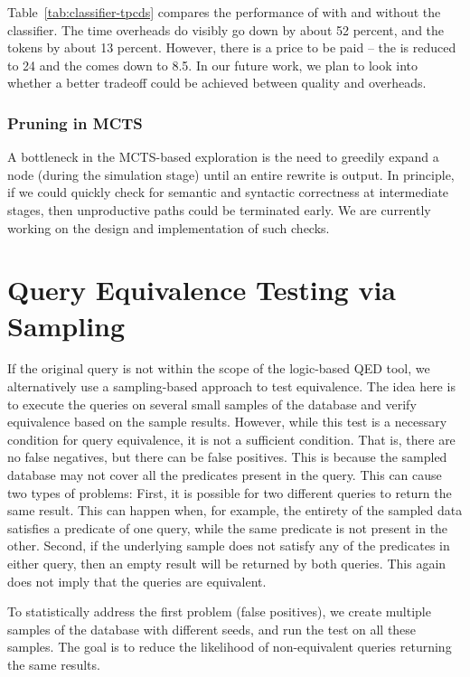 Table~\ref{tab:classifier-tpcds} compares the performance of \lithe with and without the classifier. The time overheads do visibly go down by about 52 percent, and the tokens by about 13 percent. However, there is a price to be paid -- the \cpr is reduced to 24 and the \csgm comes down to 8.5. In our future work, we plan to look into whether a better tradeoff could be achieved between quality and overheads.

\subsubsection*{Pruning in MCTS}
%
A bottleneck in the MCTS-based exploration is the need to greedily expand a node (during the simulation stage) until an entire rewrite is output. In principle, if we could quickly check for semantic and syntactic correctness at intermediate stages, then unproductive paths could be terminated early. We are currently working on the design and implementation of such checks.

\newpage
\section{Query Equivalence Testing via Sampling}
\label{app:sampling-eq}

If the original query is not within the scope of the logic-based QED tool, we alternatively use a sampling-based approach to test equivalence. The idea here is to execute the queries on several small samples of the database and verify equivalence based on the sample results. 
%
However, while this test is a necessary condition for query equivalence, it is not a sufficient condition. That is, there are no false negatives, but there can be false positives. This is because the sampled database may not cover all the predicates present in the query. This can cause two types of problems: 
First, it is possible for two different queries to return the same result. This can happen when, for example, the entirety of the sampled data satisfies a predicate of one query, while the same predicate is not present in the other. Second, if the underlying sample does not satisfy any of the predicates in either query, then an empty result will be returned by both queries. This again does not imply that the queries are equivalent.

To statistically address the first problem (false positives), we create multiple samples of the database with different seeds, and run the test on all these samples. The goal is to reduce the likelihood of non-equivalent queries returning the same results. 

